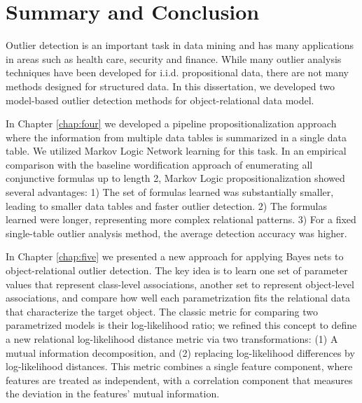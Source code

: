 
%
%

\chapter{Summary and Conclusion}\label{chap:seven}

Outlier detection is an important task in data mining and has many applications in areas such as health care, security and finance. While many outlier analysis techniques have been developed for i.i.d. propositional data, there are not many methods designed for structured data. In this dissertation, we developed two model-based outlier detection methods for object-relational data model.
 
In Chapter \ref{chap:four} we developed a pipeline propositionalization approach where the information from multiple data tables is summarized in a single data table. We utilized Markov Logic Network learning for this task. In an empirical comparison with the baseline wordification approach of enumerating all conjunctive formulas up to length 2, Markov Logic propositionalization showed several advantages: 1) The set of formulas learned was substantially smaller, leading to smaller data tables and faster outlier detection. 2) The formulas learned were longer, representing more complex relational patterns. 3) For a fixed single-table outlier analysis method, the average detection accuracy was higher.


In Chapter \ref{chap:five} we presented a new approach for applying Bayes nets to object-relational outlier detection. The key idea is to learn one set of parameter values that represent class-level associations, another set to represent object-level associations, and compare how well each parametrization fits the relational data that characterize the target object. The classic metric for comparing two parametrized models is their log-likelihood ratio; we refined this concept to define  a new relational log-likelihood distance metric via two transformations:  (1) A mutual information decomposition, and (2) replacing log-likelihood differences by log-likelihood distances. This metric combines a single feature component, where features are treated as independent, with a correlation component that measures the deviation in the features' mutual information.


